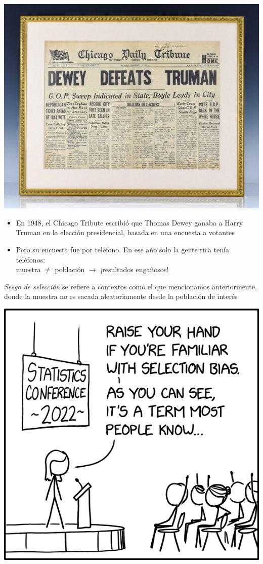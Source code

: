 \documentclass[11pt,handout,aspectratio=169]{beamer}
\begin{document}
\begin{frame}
\centering
\includegraphics[scale=.3]{dewey-defeats-truman}
\begin{itemize}
	\item 
	En 1948, el Chicago Tribute escribió que Thomas Dewey ganaba a Harry Truman en la elección presidencial, basada en una encuesta a votantes
	
	\pause
	\item
	Pero su encuesta fue por teléfono. En ese año solo la gente rica tenía teléfonos: \\
 muestra $\neq$ población $\rightarrow$ ¡resultados engañosos!
\end{itemize}

\end{frame}

\begin{frame}
\textit{Sesgo de selección} se refiere a contextos como el que mencionamos anteriormente, donde la muestra no es sacada aleatoriamente desde la población de interés

\begin{center}
\includegraphics[width = 0.45\linewidth]{selection_bias_xkcd.png}
\end{center}
\end{frame}
\end{document}
